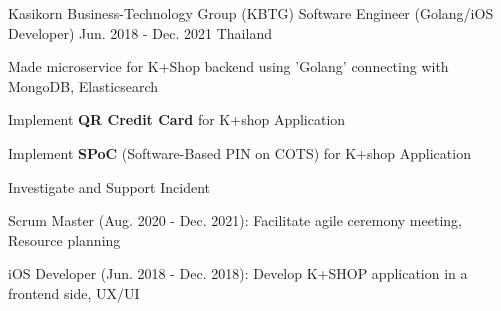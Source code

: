 \begin{cventries}
  \cventry
    {Kasikorn Business-Technology Group (KBTG)} %
    {Software Engineer (Golang/iOS Developer)} %
    {Jun. 2018 - Dec. 2021} %
    {Thailand} %
    {
      \begin{cvitems} %
        \item {Made microservice for K+Shop backend using 'Golang' connecting with MongoDB, Elasticsearch}
        \item {Implement \textbf{QR Credit Card} for K+shop Application}
        \item {Implement \textbf{SPoC} (Software-Based PIN on COTS) for K+shop Application}
        \item {Investigate and Support Incident}
        \item {Scrum Master (Aug. 2020 - Dec. 2021): Facilitate agile ceremony meeting, Resource planning}
        \item {iOS Developer (Jun. 2018 - Dec. 2018): Develop K+SHOP application in a frontend side, UX/UI}
      \end{cvitems}
    }




\end{cventries}
